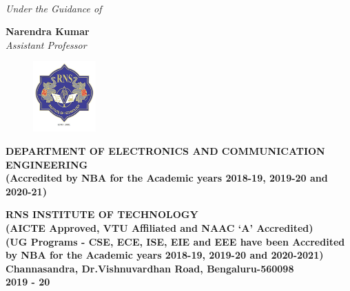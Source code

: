 \begin{titlingpage}
\begin{tabular}{lll}
\end{tabular}
\vspace{0.5cm}\\
\textit{\color{white}Under the Guidance of}


\Large{\textbf{\color{white} Narendra Kumar}}\\
\textit{\color{white}Assistant Professor}\\

\begin{figure}[h]
	\centering
	\includegraphics[height=2.7cm]{images/rns1.jpg}
\end{figure}


\begin{center}
	\scriptsize\textbf{\color{white}DEPARTMENT OF ELECTRONICS AND COMMUNICATION ENGINEERING}\\
	\small\textbf{\color{white}(Accredited by NBA for the Academic years 2018-19, 2019-20 and 2020-21)}	
\end{center}
\begin{center}
	\vspace{0.1cm}
	\large\textbf{\color{white}RNS INSTITUTE OF TECHNOLOGY}\\
	\small\textbf{\color{white}(AICTE Approved, VTU Affiliated and NAAC `A' Accredited)\\
		(UG Programs - CSE, ECE, ISE, EIE and EEE have been Accredited by NBA for the Academic years 2018-19, 2019-20 and 2020-2021)\\
		Channasandra, Dr.Vishnuvardhan Road, Bengaluru-560098\\
		2019 - 20}
\end{center}
\end{titlingpage}

